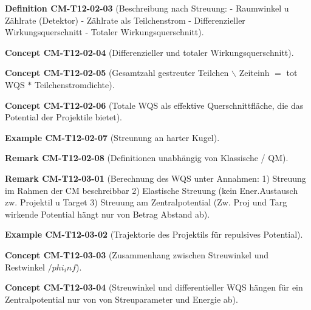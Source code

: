 \documentclass[10pt, letterpaper]{article}
\newcommand{\CustomHeading}[3]{%
  \par\medskip\noindent%
  \textbf{#1 #2} \textnormal{(#3)}.\enskip%
}
\newenvironment{DEF}[2]{\CustomHeading{Definition}{#1}{#2}}{}
\newenvironment{REM}[2]{\CustomHeading{Remark}{#1}{#2}}{}
\newenvironment{EXA}[2]{\CustomHeading{Example}{#1}{#2}}{}
\newenvironment{CONC}[2]{\CustomHeading{Concept}{#1}{#2}}{}
\begin{document}
\begin{DEF}{CM-T12-02-03}{Beschreibung nach Streuung:
- Raumwinkel u Zählrate (Detektor)
- Zählrate als Teilchenstrom
- Differenzieller Wirkungsquerschnitt
- Totaler Wirkungsquerschnitt}
\end{DEF}

\begin{CONC}{CM-T12-02-04}{Differenzieller und totaler Wirkungsquerschnitt}
\end{CONC}

\begin{CONC}{CM-T12-02-05}{Gesamtzahl gestreuter Teilchen $\backslash$ Zeiteinh $=$ tot WQS $*$ Teilchenstromdichte}
\end{CONC}

\begin{CONC}{CM-T12-02-06}{Totale WQS als effektive Querschnittfläche, die das Potential der Projektile bietet}
\end{CONC}

\begin{EXA}{CM-T12-02-07}{Streunung an harter Kugel}
\end{EXA}

\begin{REM}{CM-T12-02-08}{Definitionen unabhängig von Klassische / QM}
\end{REM}

\begin{REM}{CM-T12-03-01}{Berechnung des WQS unter Annahmen:
1) Streuung im Rahmen der CM beschreibbar
2) Elastische Streuung (kein Ener.Austausch zw. Projektil u Target
3) Streuung am Zentralpotential (Zw. Proj und Targ wirkende Potential hängt nur von Betrag Abstand ab}
\end{REM}

\begin{EXA}{CM-T12-03-02}{Trajektorie des Projektils für repulsives Potential}
\end{EXA}

\begin{CONC}{CM-T12-03-03}{Zusammenhang zwischen Streuwinkel und Restwinkel $/phi_inf$}
\end{CONC}

\begin{CONC}{CM-T12-03-04}{Streuwinkel und differentieller WQS hängen für ein Zentralpotential nur von von Streuparameter und Energie ab}
\end{CONC}
\end{document}
